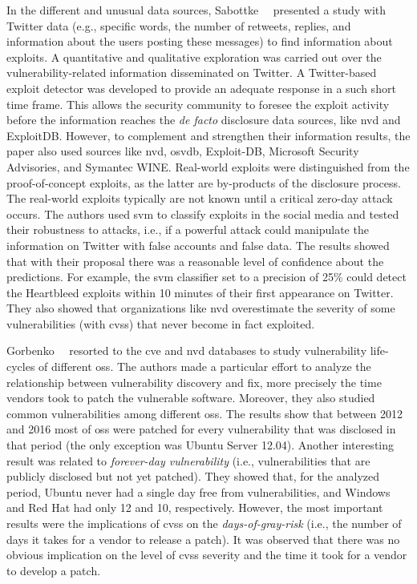In the different and unusual data sources, Sabottke~\etal{}~\cite{Sabottke:2015} presented a study with Twitter data (e.g., specific words, the number of retweets, replies, and information about the users posting these messages) to find information about exploits. 
A quantitative and qualitative exploration was carried out over the vulnerability-related information disseminated on Twitter.
A Twitter-based exploit detector was developed to provide an adequate response in a such short time frame. 
This allows the security community to foresee the exploit activity before the information reaches the \emph{de facto} disclosure data sources, like \gls{nvd} and ExploitDB.
However, to complement and strengthen their information results, the paper also used sources like \gls{nvd}, \gls{osvdb}, Exploit-DB, Microsoft Security Advisories, and Symantec WINE. 
Real-world exploits were distinguished from the proof-of-concept exploits, as the latter are by-products of the disclosure process. 
The real-world exploits typically are not known until a critical zero-day attack occurs. 
The authors used \gls{svm} to classify exploits in the social media and tested their robustness to attacks, i.e., if a powerful attack could manipulate the information on Twitter with false accounts and false data. 
The results showed that with their proposal there was a reasonable level of confidence about the predictions. 
For example, the \gls{svm} classifier set to a precision of 25\% could detect the Heartbleed exploits within 10 minutes of their first appearance on Twitter. 
They also showed that organizations like \gls{nvd} overestimate the severity of some vulnerabilities (with \gls{cvss}) that never become in fact exploited.


Gorbenko~\etal{}~\cite{Gorbenko:2017} resorted to the \gls{cve} and \gls{nvd} databases to study vulnerability life-cycles of different \glspl{os}.
The authors made a particular effort to analyze the relationship between vulnerability discovery and fix, more precisely the time vendors took to patch the vulnerable software.
Moreover, they also studied common vulnerabilities among different \glspl{os}.
The results show that between 2012 and 2016 most of \glspl{os} were patched for every vulnerability that was disclosed in that period (the only exception was Ubuntu Server 12.04).
Another interesting result was related to \emph{forever-day vulnerability} (i.e., vulnerabilities that are publicly disclosed but not yet patched). 
They showed that, for the analyzed period, Ubuntu never had a single day free from vulnerabilities, and Windows and Red Hat had only 12 and 10, respectively.
However, the most important results were the implications of \gls{cvss} on the \emph{days-of-gray-risk} (i.e., the number of days it takes for a vendor to release a patch). 
It was observed that there was no obvious implication on the level of \gls{cvss} severity and the time it took for a vendor to develop a patch.


